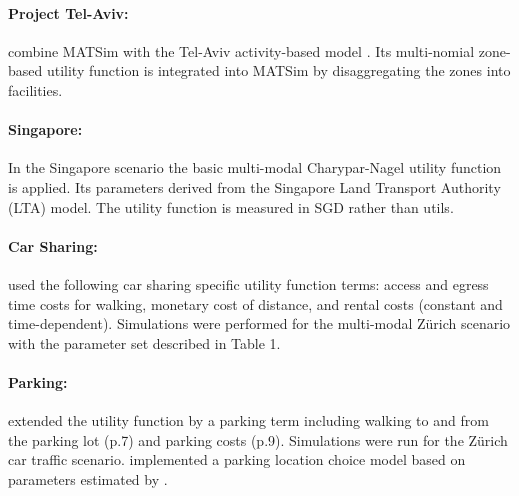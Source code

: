 \paragraph{Project Tel-Aviv:}
\citet[][]{BekhorEtAl_TRB_2011, DoblerEtAl_TechRep_IVT_2014} combine MATSim with the Tel-Aviv activity-based model \citep[][]{CambrigeSystemsInc_ResRep_TelAviv_2008}. Its multi-nomial zone-based utility function is integrated into MATSim by disaggregating the zones into facilities.


\paragraph{Singapore:}
In the Singapore scenario \citep[][]{ErathEtAl_IATBR_2012} the basic multi-modal Charypar-Nagel utility function is applied. Its parameters derived from the Singapore Land Transport Authority (LTA) model. The utility function is measured in SGD rather than utils.

\paragraph{Car Sharing:}
\citet[][p.10]{CiariEtAl_TechRep_IVT_2014} used the following car sharing specific utility function terms: access and egress time costs for walking, monetary cost of distance, and rental costs (constant and time-dependent). Simulations were performed for the multi-modal Zürich scenario with the parameter set described in Table 1.

\paragraph{Parking:}
\citet[][]{WaraichAxhausen_TechRep_IVT_2012} extended the utility function by a parking term including walking to and from the parking lot (p.7) and parking costs (p.9). Simulations were run for the Zürich car traffic scenario. \citet{WaraichEtAl_unpub_TRB_2013} implemented a parking location choice model based on parameters estimated by \citet[][]{WeisEtAl_TechRep_TSMS_2013}.

